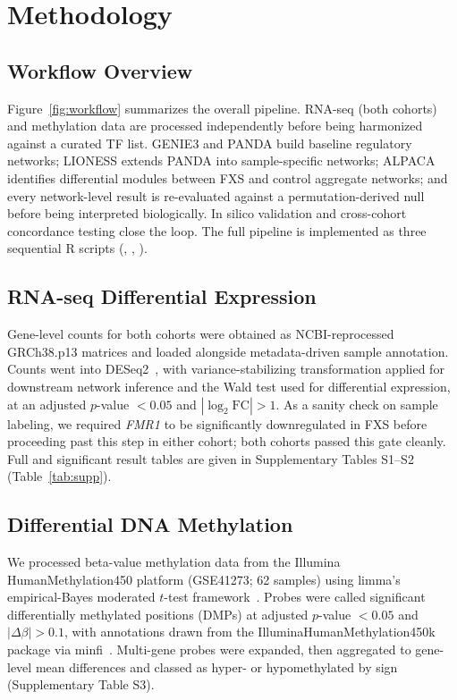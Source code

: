 \documentclass[journal]{IEEEtran}
\newcommand{\gene}[1]{\textit{#1}}
\begin{document}
\section{Methodology}
\subsection{Workflow Overview}
Figure~\ref{fig:workflow} summarizes the overall pipeline. RNA-seq (both cohorts) and methylation data are processed independently before being harmonized against a curated TF list. GENIE3 and PANDA build baseline regulatory networks; LIONESS extends PANDA into sample-specific networks; ALPACA identifies differential modules between FXS and control aggregate networks; and every network-level result is re-evaluated against a permutation-derived null before being interpreted biologically. In silico validation and cross-cohort concordance testing close the loop. The full pipeline is implemented as three sequential R scripts (, , ).

\subsection{RNA-seq Differential Expression}
Gene-level counts for both cohorts were obtained as NCBI-reprocessed GRCh38.p13 matrices and loaded alongside metadata-driven sample annotation. Counts went into DESeq2~\cite{deseq2}, with variance-stabilizing transformation applied for downstream network inference and the Wald test used for differential expression, at an adjusted $p$-value $<0.05$ and $|\log_2\mathrm{FC}|>1$. As a sanity check on sample labeling, we required \gene{FMR1} to be significantly downregulated in FXS before proceeding past this step in either cohort; both cohorts passed this gate cleanly. Full and significant result tables are given in Supplementary Tables S1--S2 (Table~\ref{tab:supp}).

\subsection{Differential DNA Methylation}
We processed beta-value methylation data from the Illumina HumanMethylation450 platform (GSE41273; 62 samples) using limma's empirical-Bayes moderated $t$-test framework~\cite{limma}. Probes were called significant differentially methylated positions (DMPs) at adjusted $p$-value $<0.05$ and $|\Delta\beta|>0.1$, with annotations drawn from the IlluminaHumanMethylation450k package via minfi~\cite{minfi}. Multi-gene probes were expanded, then aggregated to gene-level mean differences and classed as hyper- or hypomethylated by sign (Supplementary Table S3).
\end{document}
